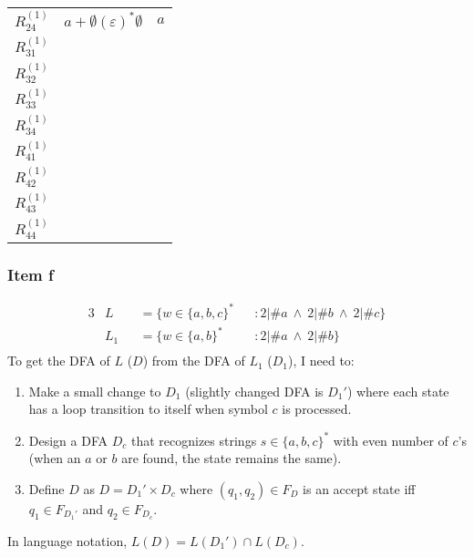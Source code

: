 {\begin{minipage}[c]{0.49\textwidth}
\begin{center}
\begin{tabular}{r || c | c}
			$R_{24}^{(1)}$ & $a+\emptyset(\varepsilon)^*\emptyset$ & $a$ \\ 
			$R_{31}^{(1)}$ &   &   \\
			$R_{32}^{(1)}$ &   &   \\
			$R_{33}^{(1)}$ &   &   \\
			$R_{34}^{(1)}$ &   &   \\
			$R_{41}^{(1)}$ &   &   \\
			$R_{42}^{(1)}$ &   &   \\
			$R_{43}^{(1)}$ &   &   \\
			$R_{44}^{(1)}$ &   &   \\  
		\end{tabular}
	\end{center}
\end{minipage}
\pagebreak
\subsubsection{Item f}
\begin{alignat*}{3}
	&L   &&= \{w \in \{a,b,c\}^* && \colon 2|\#a~\wedge~2|\#b~\wedge~2|\#c\}\\
	&L_1 &&= \{w \in \{a,b\}^* && \colon 2|\#a~\wedge~2|\#b\}\\
\end{alignat*}
To get the DFA of $L$ ($D$) from the DFA of $L_1$ ($D_1$), I need to:
\begin{enumerate}
	\item Make a small change to $D_1$ (slightly changed DFA is $D_1'$) where each state has a loop transition to itself when symbol $c$ is processed.
	\item Design a DFA $D_c$ that recognizes strings $s\in \{a,b,c\}^*$ with even number of $c$'s (when an $a$ or $b$ are found, the state remains the same).
	\item Define $D$ as $D=D_1' \times D_c$ where $(q_1,q_2) \in F_D$ is an accept state iff $q_1 \in F_{D_1'}$ and $q_2 \in F_{D_c}$.
\end{enumerate}
In language notation, $L(D)=L(D_1') \cap L(D_c)$.
}
